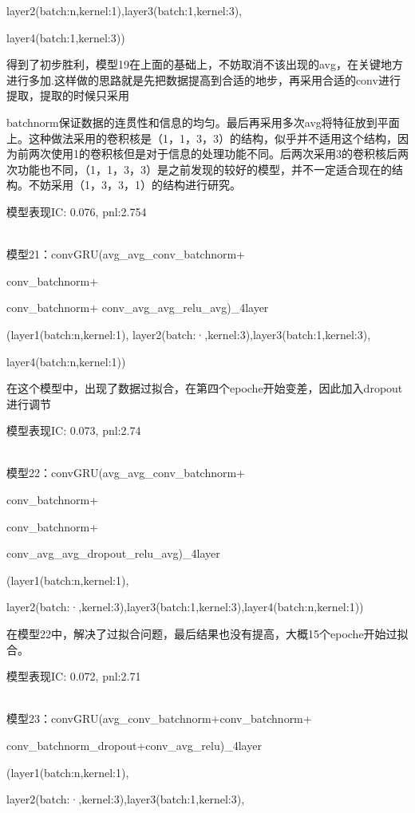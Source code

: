 \documentclass[11pt]{ctexart}
\begin{document}
layer2(batch:n,kernel:1),layer3(batch:1,kernel:3),

layer4(batch:1,kernel:3))

得到了初步胜利，模型19在上面的基础上，不妨取消不该出现的avg，在关键地方进行多加.这样做的思路就是先把数据提高到合适的地步，再采用合适的conv进行提取，提取的时候只采用 \par batchnorm保证数据的连贯性和信息的均匀。最后再采用多次avg将特征放到平面上。这种做法采用的卷积核是（1，1，3，3）的结构，似乎并不适用这个结构，因为前两次使用1的卷积核但是对于信息的处理功能不同。后两次采用3的卷积核后两次功能也不同，（1，1，3，3）是之前发现的较好的模型，并不一定适合现在的结构。不妨采用（1，3，3，1）的结构进行研究。

模型表现{\kaishu \small IC: 0.076, pnl:2.754}

~\\
模型21：convGRU(avg\_avg\_conv\_batchnorm+

conv\_batchnorm+

conv\_batchnorm+
conv\_avg\_avg\_relu\_avg)\_4layer

(layer1(batch:n,kernel:1), layer2(batch:·,kernel:3),layer3(batch:1,kernel:3),

layer4(batch:n,kernel:1))

在这个模型中，出现了数据过拟合，在第四个epoche开始变差，因此加入dropout进行调节

模型表现{\kaishu \small IC: 0.073, pnl:2.74}

~\\
模型22：convGRU(avg\_avg\_conv\_batchnorm+

conv\_batchnorm+

conv\_batchnorm+

conv\_avg\_avg\_dropout\_relu\_avg)\_4layer

(layer1(batch:n,kernel:1), 

layer2(batch:·,kernel:3),layer3(batch:1,kernel:3),layer4(batch:n,kernel:1))

在模型22中，解决了过拟合问题，最后结果也没有提高，大概15个epoche开始过拟合。

模型表现{\kaishu \small IC: 0.072, pnl:2.71}

~\\
模型23：convGRU(avg\_conv\_batchnorm+conv\_batchnorm+

conv\_batchnorm\_dropout+conv\_avg\_relu)\_4layer

(layer1(batch:n,kernel:1), 

layer2(batch:·,kernel:3),layer3(batch:1,kernel:3),
\end{document}

